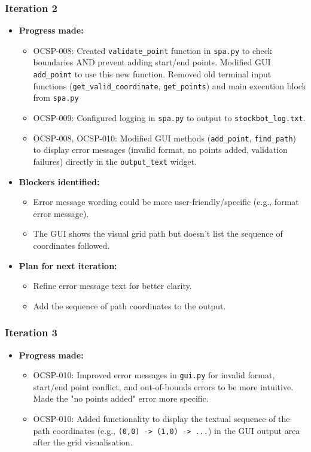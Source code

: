 \subsubsection{Iteration 2}
\begin{itemize}
	\item \textbf{Progress made:}
	\begin{itemize}
		\item OCSP-008: Created \verb|validate_point| function in \verb|spa.py| to check boundaries AND prevent adding start/end points. Modified GUI \verb|add_point| to use this new function. Removed old terminal input functions (\verb|get_valid_coordinate|, \verb|get_points|) and main execution block from \verb|spa.py|
		\item OCSP-009: Configured logging in \verb|spa.py| to output to \verb|stockbot_log.txt|.
		\item OCSP-008, OCSP-010: Modified GUI methods (\verb|add_point|, \verb|find_path|) to display error messages (invalid format, no points added, validation failures) directly in the \verb|output_text| widget.
	\end{itemize}
	\item \textbf{Blockers identified:}
	\begin{itemize}
		\item Error message wording could be more user-friendly/specific (e.g., format error message).
		\item The GUI shows the visual grid path but doesn't list the sequence of coordinates followed.
	\end{itemize}
	\item \textbf{Plan for next iteration:}
	\begin{itemize}
		\item Refine error message text for better clarity.
		\item Add the sequence of path coordinates to the output.
	\end{itemize}
\end{itemize}

\subsubsection{Iteration 3}
\begin{itemize}
	\item \textbf{Progress made:}
	\begin{itemize}
		\item OCSP-010: Improved error messages in \verb|gui.py| for invalid format, start/end point conflict, and out-of-bounds errors to be more intuitive. Made the "no points added" error more specific.
		\item OCSP-010: Added functionality to display the textual sequence of the path coordinates (e.g., \verb|(0,0) -> (1,0) -> ...|) in the GUI output area after the grid visualisation.
	\end{itemize}
\end{itemize}

